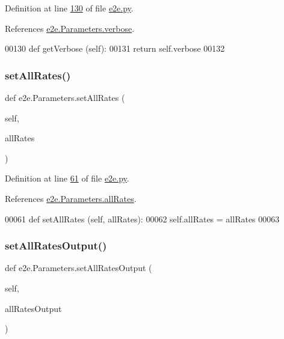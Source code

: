 Definition at line \hyperlink{e2e_8py_source_l00130}{130} of file \hyperlink{e2e_8py_source}{e2e.\+py}.



References \hyperlink{e2e_8py_source_l00041}{e2e.\+Parameters.\+verbose}.


\begin{DoxyCode}
00130     \textcolor{keyword}{def }getVerbose (self):
00131         \textcolor{keywordflow}{return} self.verbose
00132         
\end{DoxyCode}
\mbox{\label{classe2e_1_1_parameters_a764caaf0903863ccf240217b15999dc0}} 
\subsubsection{\texorpdfstring{set\+All\+Rates()}{setAllRates()}}
{\footnotesize\ttfamily def e2e.\+Parameters.\+set\+All\+Rates (\begin{DoxyParamCaption}\item[{}]{self,  }\item[{}]{all\+Rates }\end{DoxyParamCaption})}



Definition at line \hyperlink{e2e_8py_source_l00061}{61} of file \hyperlink{e2e_8py_source}{e2e.\+py}.



References \hyperlink{e2e_8py_source_l00030}{e2e.\+Parameters.\+all\+Rates}.


\begin{DoxyCode}
00061     \textcolor{keyword}{def }setAllRates (self, allRates):
00062         self.allRates = allRates
00063 
\end{DoxyCode}
\mbox{\label{classe2e_1_1_parameters_a23a4ae20df9dbbb411654c45c5bbfa17}} 
\subsubsection{\texorpdfstring{set\+All\+Rates\+Output()}{setAllRatesOutput()}}
{\footnotesize\ttfamily def e2e.\+Parameters.\+set\+All\+Rates\+Output (\begin{DoxyParamCaption}\item[{}]{self,  }\item[{}]{all\+Rates\+Output }\end{DoxyParamCaption})}



